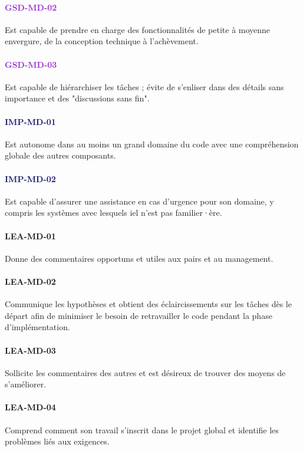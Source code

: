 \documentclass[a4paper, french, openany, 12pt]{book}
\newcommand\str[1]{\textcolor{DarkOrchid}{\textbf{\uppercase{gsd-{#1}}}}}
\newcommand\wis[1]{\textcolor{MidnightBlue}{\textbf{\uppercase{imp-{#1}}}}}
\newcommand\cha[1]{\textcolor{OliveGreen}{\textbf{\uppercase{lea-{#1}}}}}
\begin{document}
\begin{multicols}{2}
  \paragraph*{\str{md-02}}

  Est capable de prendre en charge des fonctionnalités de petite à moyenne envergure, de la conception technique à
  l'achèvement.

  \paragraph*{\str{md-03}}

  Est capable de hiérarchiser les tâches ; évite de s'enliser dans des détails sans importance et des "discussions sans
  fin".

  \paragraph*{\wis{md-01}}

  Est autonome dans au moins un grand domaine du code avec une compréhension globale des autres composants.

  \paragraph*{\wis{md-02}}

  Est capable d'assurer une assistance en cas d'urgence pour son domaine, y compris les systèmes avec lesquels iel
  n'est pas familier·ère.

  \paragraph*{\cha{md-01}}

  Donne des commentaires opportuns et utiles aux pairs et au management.

  \paragraph*{\cha{md-02}}

  Communique les hypothèses et obtient des éclaircissements sur les tâches dès le départ afin de minimiser le besoin de
  retravailler le code pendant la phase d'implémentation.

  \paragraph*{\cha{md-03}}

  Sollicite les commentaires des autres et est désireux de trouver des moyens de s'améliorer.

  \paragraph*{\cha{md-04}}

  Comprend comment son travail s'inscrit dans le projet global et identifie les problèmes liés aux exigences.

\end{multicols}
\end{document}
